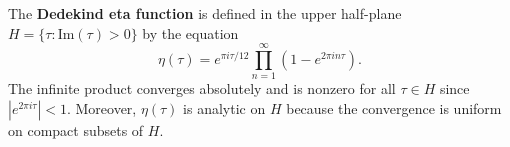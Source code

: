 The \textbf{Dedekind eta function} is defined in the upper half-plane $H = \{\tau : \text{Im}(\tau) > 0\}$ by the equation
$$\eta(\tau) = e^{\pi i \tau / 12} \prod_{n=1}^{\infty} (1 - e^{2 \pi i n \tau}).$$
The infinite product converges absolutely and is nonzero for all $\tau \in H$ since $|e^{2\pi i \tau}| < 1$. Moreover, $\eta(\tau)$ is analytic on $H$ because the convergence is uniform on compact subsets of $H$.
